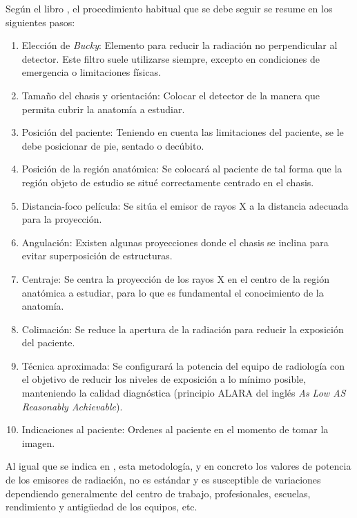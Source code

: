 Según el libro \cite{manualpractico}, el procedimiento habitual que se debe seguir se resume en los siguientes pasos:
\begin{enumerate}
    \item Elección de \emph{Bucky}: Elemento para reducir la radiación no perpendicular al detector. Este filtro suele utilizarse siempre, excepto en condiciones de emergencia o limitaciones físicas.
    \item Tamaño del chasis y orientación: Colocar el detector de la manera que permita cubrir la anatomía a estudiar.
    \item Posición del paciente: Teniendo en cuenta las limitaciones del paciente, se le debe posicionar de pie, sentado o decúbito.
    \item Posición de la región anatómica: 
    Se colocará al paciente de tal forma que la región objeto de estudio se situé correctamente centrado en el chasis.
    \item Distancia-foco película: Se sitúa el emisor de rayos X a la distancia adecuada para la proyección.
    \item Angulación: Existen algunas proyecciones donde el chasis se inclina para evitar superposición de estructuras.
    \item Centraje: Se centra la proyección de los rayos X en el centro de la región anatómica a estudiar, para lo que es fundamental el conocimiento de la anatomía.
    \item Colimación: Se reduce la apertura de la radiación para reducir la exposición del paciente.
    \item Técnica aproximada: Se configurará la potencia del equipo de radiología con el objetivo de reducir los niveles de exposición a lo mínimo posible, manteniendo la calidad diagnóstica (principio ALARA del inglés \emph{As Low AS Reasonably Achievable}\cite{manualpractico}). 
    \item Indicaciones al paciente: Ordenes al paciente en el momento de tomar la imagen.
\end{enumerate}

Al igual que se indica en \cite{manualpractico}, esta metodología, y en concreto los valores de potencia de los emisores de radiación, no es estándar y es susceptible de variaciones dependiendo generalmente del centro de trabajo, profesionales, escuelas, rendimiento y antigüedad de los equipos, etc. 



